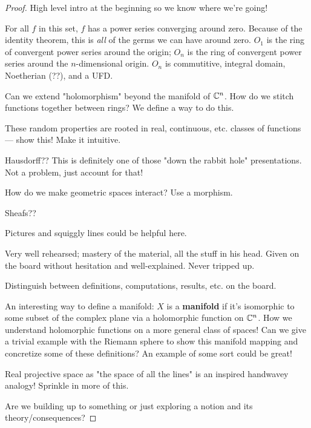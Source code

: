 \documentclass[../finalProject.tex]{subfiles}
\begin{document}
\begin{itemize}
\begin{proof}
        High level intro at the beginning so we know where we're going!

        For all $f$ in this set, $f$ has a power series converging around zero. Because of the identity theorem, this is \emph{all} of the germs we can have around zero. $O_1$ is the ring of convergent power series around the origin; $O_n$ is the ring of convergent power series around the $n$-dimensional origin. $O_n$ is commutitive, integral domain, Noetherian (??), and a UFD.

        Can we extend "holomorphism" beyond the manifold of $\mathbb{C}^n$.
        How do we stitch functions together between rings? We define a way to do this.

        These random properties are rooted in real, continuous, etc. classes of functions --- show this! Make it intuitive.

        Hausdorff?? This is definitely one of those "down the rabbit hole" presentations. Not a problem, just account for that!

        How do we make geometric spaces interact? Use a morphism.

        Sheafs??

        Pictures and squiggly lines could be helpful here.

        Very well rehearsed; mastery of the material, all the stuff in his head. Given on the board without hesitation and well-explained. Never tripped up.

        Distinguish between definitions, computations, results, etc. on the board.

        An interesting way to define a manifold: $X$ is a \textbf{manifold} if it's isomorphic to some subset of the complex plane via a holomorphic function on $\mathbb{C}^n$. How we understand holomorphic functions on a more general class of spaces! Can we give a trivial example with the Riemann sphere to show this manifold mapping and concretize some of these definitions? An example of some sort could be great!

        Real projective space as "the space of all the lines" is an inspired handwavey analogy! Sprinkle in more of this.

        Are we building up to something or just exploring a notion and its theory/consequences?
    \end{proof}
\end{itemize}
\end{document}
